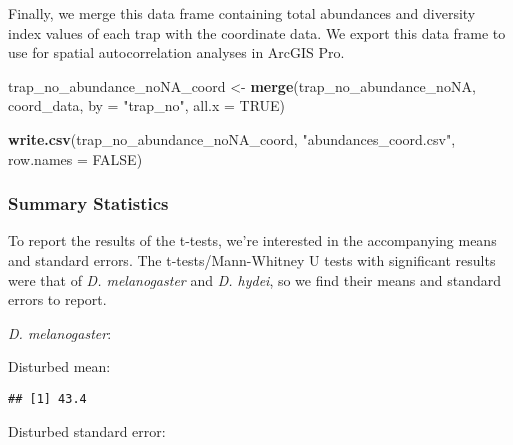 \documentclass[
]{article}
\newenvironment{Shaded}{\begin{snugshade}}{\end{snugshade}}
\newcommand{\AttributeTok}[1]{\textcolor[rgb]{0.13,0.29,0.53}{#1}}
\newcommand{\ConstantTok}[1]{\textcolor[rgb]{0.56,0.35,0.01}{#1}}
\newcommand{\FunctionTok}[1]{\textcolor[rgb]{0.13,0.29,0.53}{\textbf{#1}}}
\newcommand{\NormalTok}[1]{#1}
\newcommand{\OtherTok}[1]{\textcolor[rgb]{0.56,0.35,0.01}{#1}}
\newcommand{\SpecialCharTok}[1]{\textcolor[rgb]{0.81,0.36,0.00}{\textbf{#1}}}
\newcommand{\StringTok}[1]{\textcolor[rgb]{0.31,0.60,0.02}{#1}}
\begin{document}
Finally, we merge this data frame containing total abundances and
diversity index values of each trap with the coordinate data. We export
this data frame to use for spatial autocorrelation analyses in ArcGIS
Pro.

\begin{Shaded}
\begin{Highlighting}[]
\NormalTok{trap\_no\_abundance\_noNA\_coord }\OtherTok{\textless{}{-}} \FunctionTok{merge}\NormalTok{(trap\_no\_abundance\_noNA, coord\_data, }\AttributeTok{by =} \StringTok{"trap\_no"}\NormalTok{, }\AttributeTok{all.x =} \ConstantTok{TRUE}\NormalTok{)}

\FunctionTok{write.csv}\NormalTok{(trap\_no\_abundance\_noNA\_coord, }\StringTok{"abundances\_coord.csv"}\NormalTok{, }\AttributeTok{row.names =} \ConstantTok{FALSE}\NormalTok{)}
\end{Highlighting}
\end{Shaded}

\hypertarget{summary-statistics}{%
\subsubsection{Summary Statistics}\label{summary-statistics}}

To report the results of the t-tests, we're interested in the
accompanying means and standard errors. The t-tests/Mann-Whitney U tests
with significant results were that of \emph{D. melanogaster} and
\emph{D. hydei}, so we find their means and standard errors to report.

\emph{D. melanogaster}:

Disturbed mean:

\begin{Shaded}
\end{Shaded}

\begin{verbatim}
## [1] 43.4
\end{verbatim}

Disturbed standard error:

\begin{Shaded}
\end{Shaded}
\end{document}
